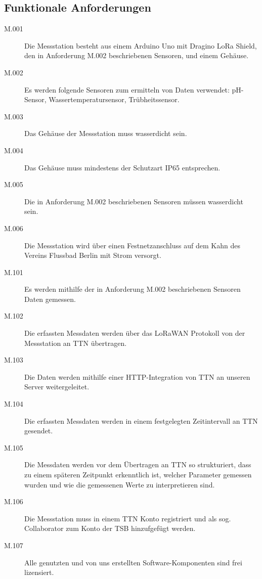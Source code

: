 \subsection{Funktionale Anforderungen}\label{subsec:func_require}

\begin{description}
	\item[M.001]
		Die Messstation besteht aus einem Arduino Uno mit Dragino LoRa Shield, den in
		Anforderung M.002 beschriebenen Sensoren, und einem Gehäuse.

	\item[M.002]
		Es werden folgende Sensoren zum ermitteln von Daten verwendet: pH-Sensor,
		Wassertemperatursensor, Trübheitssensor.

	\item[M.003]
		Das Gehäuse der Messstation muss wasserdicht sein.

	\item[M.004]
		Das Gehäuse muss mindestens der Schutzart IP65 entsprechen.

	\item[M.005]
		Die in Anforderung M.002 beschriebenen Sensoren müssen wasserdicht sein.

	\item[M.006]
		Die Messstation wird über einen Festnetzanschluss auf dem Kahn des Vereins
		\glqq Flussbad Berlin\grqq{} mit Strom versorgt.
\end{description}

\begin{description}
	\item[M.101]
		Es werden mithilfe der in Anforderung M.002 beschriebenen Sensoren Daten gemessen.

	\item[M.102]
		Die erfassten Messdaten werden über das LoRaWAN Protokoll von der Messstation
		an TTN übertragen.

	\item[M.103]
		Die Daten werden mithilfe einer HTTP-Integration von TTN an unseren Server
		weitergeleitet.

	\item[M.104]
		Die erfassten Messdaten werden in einem festgelegten Zeitintervall an TTN
		gesendet.

	\item[M.105]
		Die Messdaten werden vor dem Übertragen an TTN so strukturiert, dass zu einem
		späteren Zeitpunkt erkenntlich ist, welcher Parameter gemessen wurden und wie
		die gemessenen Werte zu interpretieren sind.

	\item[M.106]
		Die Messstation muss in einem TTN Konto registriert und als sog.
		\glqq Collaborator\grqq{} zum Konto der TSB hinzufgefügt werden.

	\item[M.107]
		Alle genutzten und von uns erstellten Software-Komponenten sind frei lizensiert.
\end{description}

